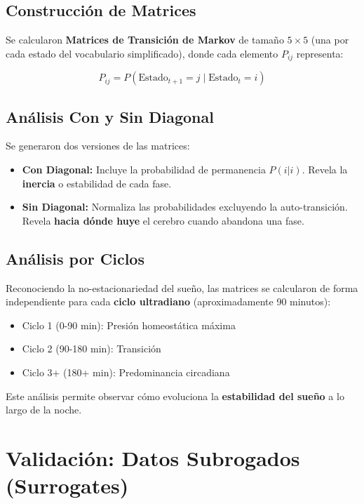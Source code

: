 \subsection{Construcción de Matrices}

Se calcularon \textbf{Matrices de Transición de Markov} de tamaño $5 \times 5$ (una por cada estado del vocabulario simplificado), donde cada elemento $P_{ij}$ representa:

\begin{equation}
    P_{ij} = P(\text{Estado}_{t+1} = j \mid \text{Estado}_t = i)
    \label{eq:prob_transicion}
\end{equation}

\subsection{Análisis Con y Sin Diagonal}

Se generaron dos versiones de las matrices:
\begin{itemize}
    \item \textbf{Con Diagonal:} Incluye la probabilidad de permanencia $P(i|i)$. Revela la \textbf{inercia} o estabilidad de cada fase.
    \item \textbf{Sin Diagonal:} Normaliza las probabilidades excluyendo la auto-transición. Revela \textbf{hacia dónde huye} el cerebro cuando abandona una fase.
\end{itemize}

\subsection{Análisis por Ciclos}

Reconociendo la no-estacionariedad del sueño, las matrices se calcularon de forma independiente para cada \textbf{ciclo ultradiano} (aproximadamente 90 minutos):
\begin{itemize}
    \item Ciclo 1 (0-90 min): Presión homeostática máxima
    \item Ciclo 2 (90-180 min): Transición
    \item Ciclo 3+ (180+ min): Predominancia circadiana
\end{itemize}

Este análisis permite observar cómo evoluciona la \textbf{estabilidad del sueño} a lo largo de la noche.

\section{Validación: Datos Subrogados (Surrogates)}

